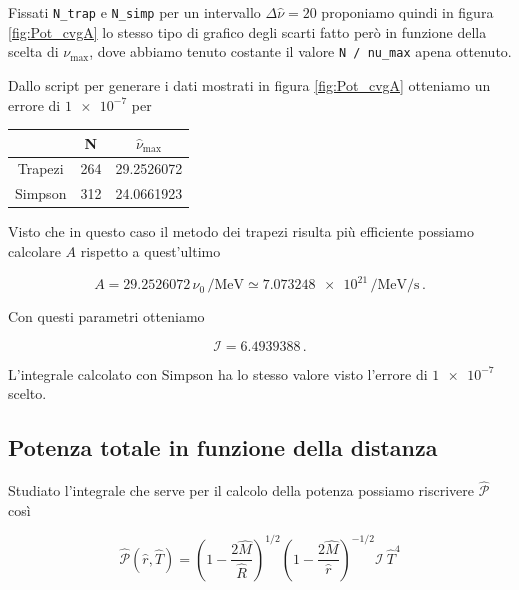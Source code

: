 \documentclass[a4paper, titlepage]{article}
\begin{document}
Fissati \texttt{N\_trap} e \texttt{N\_simp} per un intervallo
$\Delta \hat \nu = 20$ proponiamo quindi in figura \ref{fig:Pot_cvgA} lo stesso
tipo di grafico degli scarti fatto però in funzione della scelta di
$\nu_\text{max}$, dove abbiamo tenuto costante il valore \texttt{N / nu\_max}
apena ottenuto.

Dallo script per generare i dati mostrati in figura \ref{fig:Pot_cvgA} otteniamo
un errore di $\num{1e-7}$ per

\begin{table}[h]
    \centering
    \begin{tabular}{ccc}
         & N & $\hat \nu_\text{max}$ \\
        \hline
        Trapezi & 264 & 29.2526072 \\
        \hline
        Simpson & 312 & 24.0661923 \\
    \end{tabular}
\end{table}

Visto che in questo caso il metodo dei trapezi risulta più efficiente possiamo
calcolare $A$ rispetto a quest'ultimo

\begin{equation}
    A = 29.2526072 \, \nu_0 \, \unit{\per\mega\electronvolt} \simeq
    \num{7.073248e21} \, \unit{\per\mega\electronvolt\per\second} \, .
    \label{eq:A_giusto}
\end{equation}

Con questi parametri otteniamo

\begin{equation}
    \mathcal I = 6.4939388 \, .
    \label{eq:val_I}
\end{equation}

L'integrale calcolato con Simpson ha lo stesso valore visto l'errore di
$\num{1e-7}$ scelto.

\newpage

\subsection{Potenza totale in funzione della distanza}

Studiato l'integrale che serve per il calcolo della potenza possiamo riscrivere
$\mathcal{\hat P}$ così

\begin{equation}
    \mathcal{\hat P} (\hat r, \hat T)
    = \left(1 - \frac{2 \hat M}{\hat R} \right)^{1/2}
    \left(1 - \frac{2 \hat M}{\hat r} \right)^{-1/2} \mathcal I ~ \hat T^4
    \label{eq:Pot_I}
\end{equation}
\end{document}
